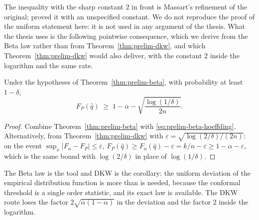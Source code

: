 \documentclass[../../../main.tex]{subfiles}
\begin{document}
The inequality with the sharp constant $2$ in front is Massart's refinement of the original; \cite{dkw1956} proved it with an unspecified constant. We do not reproduce the proof of the uniform statement here: it is not used in any argument of the thesis. What the thesis uses is the following pointwise consequence, which we derive from the Beta law rather than from Theorem~\ref{thm:prelim-dkw}, and which Theorem~\ref{thm:prelim-dkw} would also deliver, with the constant $2$ inside the logarithm and the same rate.

\begin{corollary}\label{cor:prelim-dkw-cov}
Under the hypotheses of Theorem~\ref{thm:prelim-beta}, with probability at least $1-\delta$,
\[
F_P(\hat q)\;\ge\;1-\alpha-\sqrt{\frac{\log(1/\delta)}{2n}} .
\]
\end{corollary}

\begin{proof}
Combine Theorem~\ref{thm:prelim-beta} with \eqref{eq:prelim-beta-hoeffding}. Alternatively, from Theorem~\ref{thm:prelim-dkw} with $\varepsilon=\sqrt{\log(2/\delta)/(2n)}$: on the event $\sup_x|F_n-F_P|\le\varepsilon$, $F_P(\hat q)\ge F_n(\hat q)-\varepsilon=k/n-\varepsilon\ge1-\alpha-\varepsilon$, which is the same bound with $\log(2/\delta)$ in place of $\log(1/\delta)$.
\end{proof}

The Beta law is the tool and DKW is the corollary: the uniform deviation of the empirical distribution function is more than is needed, because the conformal threshold is a single order statistic, and its exact law is available. The DKW route loses the factor $2\sqrt{\alpha(1-\alpha)}$ in the deviation and the factor $2$ inside the logarithm.

\end{document}
